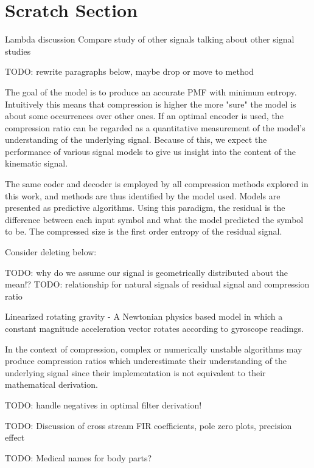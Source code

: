 \documentclass[journal]{IEEEtran}
\begin{document}
{}


\clearpage
\section*{Scratch Section}

Lambda discussion
Compare study of other signals
talking about other signal studies

TODO: rewrite paragraphs below, maybe drop or move to method

The goal of the model is to produce an accurate PMF with minimum entropy. Intuitively this means that compression is higher the more "sure" the model is about some occurrences over other ones. If an optimal encoder is used, the compression ratio can be regarded as a quantitative measurement of the model's understanding of the underlying signal. Because of this, we expect the performance of various signal models to give us insight into the content of the kinematic signal.

The same coder and decoder is employed by all compression methods explored in this work, and methods are thus identified by the model used. Models are presented as predictive algorithms. Using this paradigm, the residual is the difference between each input symbol and what the model predicted the symbol to be. The compressed size is the first order entropy of the residual signal.


Consider deleting below:

TODO: why do we assume our signal is geometrically distributed about the mean!?
TODO: relationship for natural signals of residual signal and compression ratio


Linearized rotating gravity - A Newtonian physics based model in which a constant magnitude acceleration vector rotates according to gyroscope readings.

 In the context of compression, complex or numerically unstable algorithms may produce compression ratios which underestimate their understanding of the underlying signal since their implementation is not equivalent to their mathematical derivation.

TODO: handle negatives in optimal filter derivation!

TODO: Discussion of cross stream FIR coefficients, pole zero plots, precision effect

TODO: Medical names for body parts?
\end{document}
